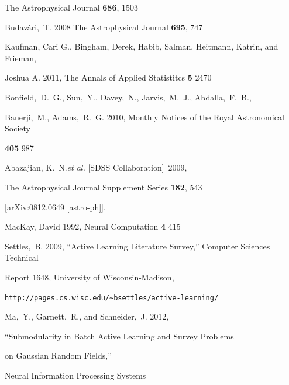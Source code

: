 \documentclass[prd,nofootbib,floatfix,11pt,tightenlines,nofootinbib]{revtex4}
\begin{document}
\begin{thebibliography}{99}
The Astrophysical Journal {\bf 686}, 1503






Budav\'ari,~T. 2008 The Astrophysical Journal {\bf 695}, 747




Kaufman, Cari G., Bingham, Derek, Habib, Salman, Heitmann, Katrin, and Frieman,

Joshua A. 2011, The Annals of Applied Statistitcs {\bf 5} 2470




Bonfield,~D.~G., Sun,~Y., Davey,~N., Jarvis,~M.~J., Abdalla,~F.~B.,

Banerji,~M., Adams,~R.~G. 2010, Monthly Notices of the Royal Astronomical Society 

{\bf 405} 987




  Abazajian, K.~N.{\it et al.}  [SDSS Collaboration]~2009,


  The Astrophysical Journal Supplement Series  {\bf 182}, 543

  [arXiv:0812.0649 [astro-ph]].





MacKay, David 1992, Neural Computation {\bf 4} 415




Settles,~B. 2009, ``Active Learning Literature Survey,'' Computer Sciences Technical

Report 1648, University of Wisconsin-Madison,

\verb|http://pages.cs.wisc.edu/~bsettles/active-learning/|




Ma,~Y., Garnett,~R., and Schneider,~J. 2012,

``Submodularity in Batch Active Learning and Survey Problems

on Gaussian Random Fields,''

Neural Information Processing Systems 


\end{thebibliography}
\end{document}
